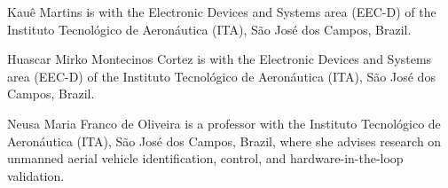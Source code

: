 \documentclass{ieeeaccess}
\begin{document}











\begin{biography}{Kau\^e Martins}
is with the Electronic Devices and Systems area (EEC-D) of the
Instituto Tecnol\'ogico de Aeron\'autica (ITA), S\~ao Jos\'e dos
Campos, Brazil. %
\end{biography}

\begin{biography}{Huascar Mirko Montecinos Cortez}
is with the Electronic Devices and Systems area (EEC-D) of the
Instituto Tecnol\'ogico de Aeron\'autica (ITA), S\~ao Jos\'e dos
Campos, Brazil. %
\end{biography}

\begin{biography}{Neusa Maria Franco de Oliveira}
is a professor with the Instituto Tecnol\'ogico de Aeron\'autica
(ITA), S\~ao Jos\'e dos Campos, Brazil, where she advises research on
unmanned aerial vehicle identification, control, and
hardware-in-the-loop validation.
\end{biography}

\EOD
\end{document}
